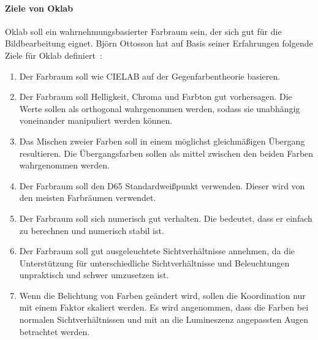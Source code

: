 \documentclass[12pt, a4paper, ngerman]{article}
\begin{document}
\paragraph{Ziele von Oklab}
Oklab soll ein wahrnehmungsbasierter Farbraum sein, der sich gut für die Bildbearbeitung eignet.
Björn Ottosson hat auf Basis seiner Erfahrungen folgende Ziele für Oklab definiert~\cite{Oklab_2020}:
\begin{enumerate}
  \item Der Farbraum soll wie CIELAB auf der Gegenfarbentheorie basieren.
  \item Der Farbraum soll Helligkeit, Chroma und Farbton gut vorhersagen. Die Werte sollen als orthogonal wahrgenommen werden, sodass sie unabhängig voneinander manipuliert werden können.
  \item Das Mischen zweier Farben soll in einem möglichst gleichmäßigen Übergang resultieren. Die Übergangsfarben sollen als mittel zwischen den beiden Farben wahrgenommen werden. 
  \item Der Farbraum soll den D65 Standardweißpunkt verwenden. Dieser wird von den meisten Farbräumen verwendet.
  \item Der Farbraum soll sich numerisch gut verhalten. Die bedeutet, dass er einfach zu berechnen und numerisch stabil ist.
  \item Der Farbraum soll gut ausgeleuchtete Sichtverhältnisse annehmen, da die Unterstützung für unterschiedliche Sichtverhältnisse und Beleuchtungen unpraktisch und schwer umzusetzen ist.
  \item Wenn die Belichtung von Farben geändert wird, sollen die Koordination nur mit einem Faktor skaliert werden. Es wird angenommen, dass die Farben bei normalen Sichtverhältnissen und mit an die Lumineszenz angepassten Augen betrachtet werden.
\end{enumerate}
\end{document}
